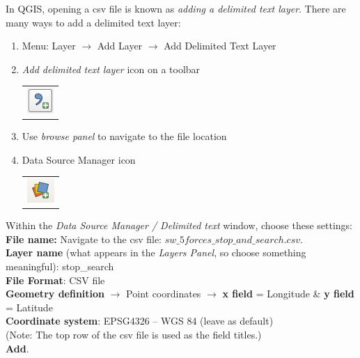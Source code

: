 In QGIS, opening a csv file is known as \textit{adding a delimited text layer}. There are many ways to add a delimited text layer:
\begin{enumerate}[~~~1)]
	\item
	Menu: Layer $\rightarrow$ Add Layer $\rightarrow$ Add Delimited Text Layer
	
	\item 
	\textit{Add delimited text layer} icon on a toolbar
	\begin{tabular}{@{}c@{}}\includegraphics[width=4ex]{images/add_delimited_text_layer_icon.png}\end{tabular}
	
	\item 
	Use \textit{browse panel} to navigate to the file location
	
	\item 
	Data Source Manager icon
	\begin{tabular}{@{}c@{}}\includegraphics[width=4ex]{images/data_source_manager_icon.png}\end{tabular}
	
	
\end{enumerate}

Within the \textit{Data Source Manager / Delimited text} window, choose these settings:\\
\textbf{File name:} Navigate to the csv file: $sw\_5forces\_stop\_and\_search.csv$.\\
\textbf{Layer name} (what appears in the \textit{Layers Panel}, so choose something meaningful): stop\_search\\
\textbf{File Format}: CSV file\\
\textbf{Geometry definition} $\rightarrow$ Point coordinates $\rightarrow$  
\textbf{x field} = Longitude \& \textbf{y field} = Latitude\\
\textbf{Coordinate system}: EPSG4326 – WGS 84 (leave as default)\\

(Note: The top row of the csv file is used as the field titles.)\\

\textbf{Add}.\\
\null\newpage

